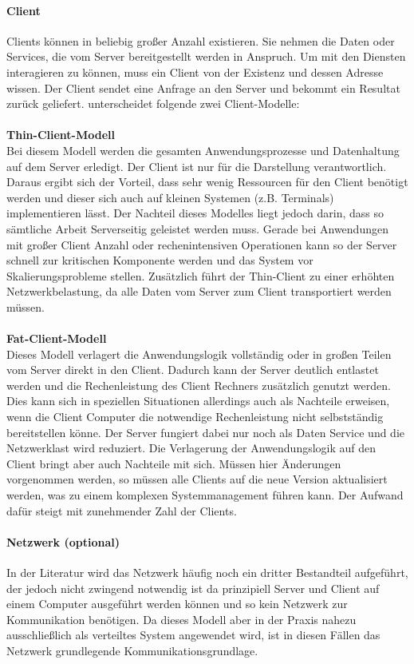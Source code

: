 	\paragraph{Client}
	Clients können in beliebig großer Anzahl existieren. Sie nehmen die Daten oder Services, die vom Server bereitgestellt werden in Anspruch. Um mit den Diensten interagieren zu können, muss ein Client von der Existenz und dessen Adresse wissen. Der Client sendet eine Anfrage an den Server und bekommt ein Resultat zurück geliefert. \citet*[S. 302]{Sommerville.2007} unterscheidet folgende zwei Client-Modelle:
	\\
	\\
	\textbf{Thin-Client-Modell}\\
	Bei diesem Modell werden die gesamten Anwendungsprozesse und Datenhaltung auf dem Server erledigt. Der Client ist nur für die Darstellung verantwortlich. Daraus ergibt sich der Vorteil, dass sehr wenig Ressourcen für den Client benötigt werden und dieser sich auch auf kleinen Systemen (z.B. Terminals) implementieren lässt. Der Nachteil dieses Modelles liegt jedoch darin, dass so sämtliche Arbeit Serverseitig geleistet werden muss. Gerade bei Anwendungen mit großer Client Anzahl oder rechenintensiven Operationen kann so der Server schnell zur kritischen Komponente werden und das System vor Skalierungsprobleme stellen. Zusätzlich führt der Thin-Client zu einer erhöhten Netzwerkbelastung, da alle Daten vom Server zum Client transportiert werden müssen.
	\\
	\\
\textbf{Fat-Client-Modell}\\
	Dieses Modell verlagert die Anwendungslogik vollständig oder in großen Teilen vom Server direkt in den Client. Dadurch kann der Server deutlich entlastet werden und die Rechenleistung des Client Rechners zusätzlich genutzt werden. Dies kann sich in speziellen Situationen allerdings auch als Nachteile erweisen, wenn die Client Computer die notwendige Rechenleistung nicht selbstständig bereitstellen könne. Der Server fungiert dabei nur noch als Daten Service und die Netzwerklast wird reduziert. Die Verlagerung der Anwendungslogik auf den Client bringt aber auch Nachteile mit sich. Müssen hier Änderungen vorgenommen werden, so müssen alle Clients auf die neue Version aktualisiert werden, was zu einem komplexen Systemmanagement führen kann. Der Aufwand dafür steigt mit zunehmender Zahl der Clients.
	
	\paragraph{Netzwerk (optional)}
	In der Literatur wird das Netzwerk häufig noch ein dritter Bestandteil aufgeführt, der jedoch nicht zwingend notwendig ist da prinzipiell Server und Client auf einem Computer ausgeführt werden können und so kein Netzwerk zur Kommunikation benötigen. Da dieses Modell aber in der Praxis nahezu ausschließlich als verteiltes System angewendet wird, ist in diesen Fällen das Netzwerk grundlegende Kommunikationsgrundlage.
	\\
	
